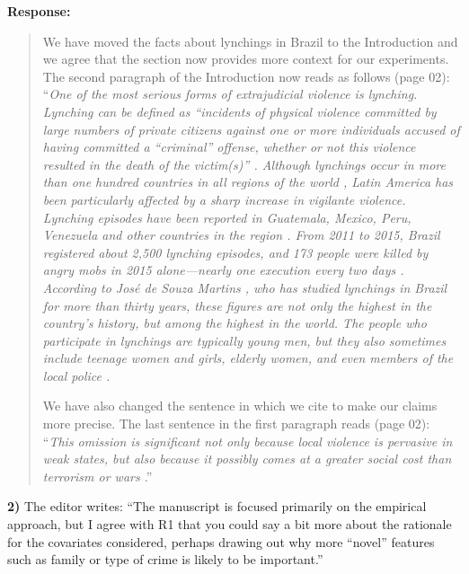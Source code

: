 \documentclass[a4paper,12pt]{article}
\begin{document}
\noindent \textbf{Response:} 
\begin{quote}

We have moved the facts about lynchings in Brazil to the Introduction and we
agree that the section now provides more context for our experiments. The
second paragraph of the Introduction now reads as follows (page 02):
``\textit{One of the most serious forms of extrajudicial violence is lynching.
  Lynching can be defined as ``incidents of physical violence committed by
  large numbers of private citizens against one or more individuals accused of
  having committed a ``criminal'' offense, whether or not this violence
  resulted in the death of the victim(s)'' \citep[645]{godoy2004justice}.
  Although lynchings occur in more than one hundred countries in all regions of
  the world \citep{jung2020lynching,smith2019contradictions}, Latin America has
  been particularly affected by a sharp increase in vigilante violence.
  Lynching episodes have been reported in Guatemala, Mexico, Peru, Venezuela
  and other countries in the region \citep{barbara2015vigilantes,
  cruz2019determinants, godoy2004justice}. From 2011 to 2015, Brazil registered
  about 2,500 lynching episodes, and 173 people were killed by angry mobs in
  2015 alone---nearly one execution every two days
  \citep{barbara2015vigilantes, oliveira2016mob}. According to José de Souza
  Martins \citeyearpar{martins2015linchamentos}, who has studied lynchings in
  Brazil for more than thirty years, these figures are not only the highest in
  the country's history, but among the highest in the world. The people who
participate in lynchings are typically young men, but they also sometimes
include teenage women and girls, elderly women, and even members of the local
police \citep{moura2017linchamentos}.}

We have also changed the sentence in which we cite \citet{blair2017predicting}
to make our claims more precise. The last sentence in the first paragraph reads
(page 02): ``\textit{This omission is significant not only because local
  violence is pervasive in weak states, but also because it possibly comes at a
greater social cost than terrorism or wars \citep{blair2017predicting}}.''

\end{quote}

\vspace{.3cm}

\noindent \textbf{2)} The editor writes: ``The manuscript is focused primarily
on the empirical approach, but I agree with R1 that you could say a bit more
about the rationale for the covariates considered, perhaps drawing out why more
``novel'' features such as family or type of crime is likely to be important.'' 
\end{document}

